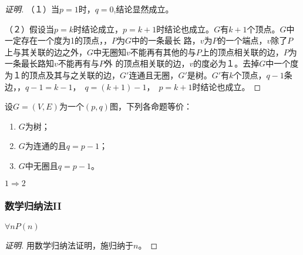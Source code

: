 \documentclass{beamer}
\begin{document}
\begin{CJK*}{UTF8}{gbsn}
\begin{frame}
\begin{proof}[证明]
    （１）当$p=1$时，$q=0$,结论显然成立。\pause

    （２）假设当$p=k$时结论成立，$p=k+1$时结论也成立。$G$有$k+1$个顶点。\pause $G$中一定存在一个度为1的顶点，，$P$为$G$中的一条最长
    路，\pause$v$为$P$的一个端点，$v$除了$P$上与其关联的边之外，$G$中无圈知$v$不能再有其他的与$P$上的顶点相关联的边，$P$为一条最长路知$v$不能再有与$P$外
    的顶点相关联的边，$v$的度必为１。\pause 去掉$G$中一个度为１的顶点及其与之关联的边，$G'$连通且无圈，$G'$是树。\pause $G'$有$k$个顶点，$q-1$条边，，$q-1 = k - 1$，　$q = (k +1) - 1$，　$p=k+1$时结论也成立。
\end{proof}
\end{frame}
\begin{frame}
  \begin{Thm1}
    设$G=(V,E)$为一个$(p,q)$图，下列各命题等价：
      \begin{enumerate}
      \item $G$为树；
      \item $G$为连通的且$q = p - 1$；
      \item $G$中无圈且$q = p - 1$。
      \end{enumerate}  
  \end{Thm1}
  $1\Rightarrow2$

  \pause
\centering
  \begin{minipage}{0.24\linewidth}
    \centering
\end{minipage}
\end{frame}
\begin{frame}
  \frametitle{数学归纳法II}

  \begin{Thm2} 
  $\forall n P(n)$   
\end{Thm2}\pause
\begin{proof}[证明]
  用数学归纳法证明，施归纳于$n$。\pause


\end{proof}
\end{frame}
\end{CJK*}
\end{document}
